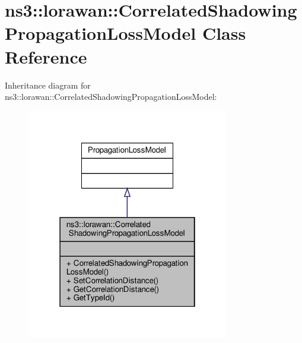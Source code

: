 \hypertarget{classns3_1_1lorawan_1_1CorrelatedShadowingPropagationLossModel}{}\section{ns3\+:\+:lorawan\+:\+:Correlated\+Shadowing\+Propagation\+Loss\+Model Class Reference}
\label{classns3_1_1lorawan_1_1CorrelatedShadowingPropagationLossModel}


Inheritance diagram for ns3\+:\+:lorawan\+:\+:Correlated\+Shadowing\+Propagation\+Loss\+Model\+:
\nopagebreak
\begin{figure}[H]
\begin{center}
\leavevmode
\includegraphics[width=250pt]{classns3_1_1lorawan_1_1CorrelatedShadowingPropagationLossModel__inherit__graph}
\end{center}
\end{figure}


